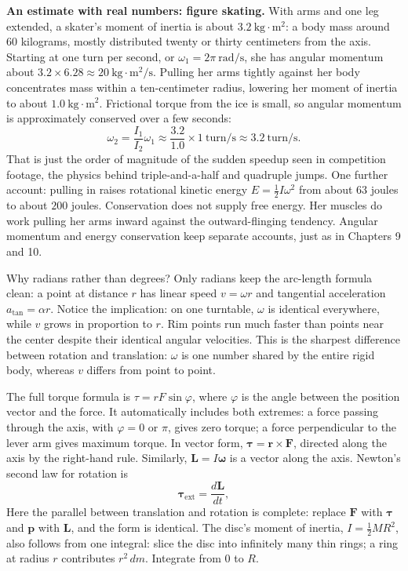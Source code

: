 \textbf{An estimate with real numbers: figure skating.} With arms and one leg extended, a skater's moment of inertia is about \(3.2\ \mathrm{kg\cdot m^2}\): a body mass around 60 kilograms, mostly distributed twenty or thirty centimeters from the axis. Starting at one turn per second, or \(\omega_1=2\pi\ \mathrm{rad/s}\), she has angular momentum about \(3.2\times6.28\approx20\ \mathrm{kg\cdot m^2/s}\). Pulling her arms tightly against her body concentrates mass within a ten-centimeter radius, lowering her moment of inertia to about \(1.0\ \mathrm{kg\cdot m^2}\). Frictional torque from the ice is small, so angular momentum is approximately conserved over a few seconds:
\[
  \omega_2=\frac{I_1}{I_2}\omega_1\approx\frac{3.2}{1.0}\times 1\ \text{turn/s}\approx 3.2\ \text{turn/s}.
\]
That is just the order of magnitude of the sudden speedup seen in competition footage, the physics behind triple-and-a-half and quadruple jumps. One further account: pulling in raises rotational kinetic energy \(E=\tfrac12 I\omega^2\) from about \(63\) joules to about \(200\) joules. Conservation does not supply free energy. Her muscles do work pulling her arms inward against the outward-flinging tendency. Angular momentum and energy conservation keep separate accounts, just as in Chapters 9 and 10.

\begin{mathbridge}
Why radians rather than degrees? Only radians keep the arc-length formula clean: a point at distance \(r\) has linear speed \(v=\omega r\) and tangential acceleration \(a_{\text{tan}}=\alpha r\). Notice the implication: on one turntable, \(\omega\) is identical everywhere, while \(v\) grows in proportion to \(r\). Rim points run much faster than points near the center despite their identical angular velocities. This is the sharpest difference between rotation and translation: \(\omega\) is one number shared by the entire rigid body, whereas \(v\) differs from point to point.

The full torque formula is \(\tau=rF\sin\varphi\), where \(\varphi\) is the angle between the position vector and the force. It automatically includes both extremes: a force passing through the axis, with \(\varphi=0\) or \(\pi\), gives zero torque; a force perpendicular to the lever arm gives maximum torque. In vector form, \(\bm{\tau}=\bm r\times\bm F\), directed along the axis by the right-hand rule. Similarly, \(\bm L=I\bm\omega\) is a vector along the axis. Newton's second law for rotation is
\[
  \bm\tau_{\text{ext}}=\frac{d\bm L}{dt},
\]
Here the parallel between translation and rotation is complete: replace \(\bm F\) with \(\bm\tau\) and \(\bm p\) with \(\bm L\), and the form is identical. The disc's moment of inertia, \(I=\tfrac12MR^2\), also follows from one integral: slice the disc into infinitely many thin rings; a ring at radius \(r\) contributes \(r^2\,dm\). Integrate from \(0\) to \(R\).
\end{mathbridge}

